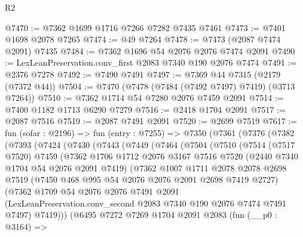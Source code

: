 \begin{lexlean}{R2}
\begin{coremodule}
@7470 := @7362 @1699 @1716 @7266 @7282 @7435 @7461
@7473 := @7401 @1698 @2078 @7265
@7474 := @49 @7264
@7478 := @7473 (@2087 @7474 @2091) @7435
@7484 := @7362 @1696 @54 @2076 @2076 @7474 @2091
@7490 := LexLeanPreservation.conv_first @2083 @7340 @190 @2076 @7474
@7491 := @2376 @7278
@7492 := @7490 @7491
@7497 := @7369 @44 @7315 (@2179 (@7372 @44))
@7504 := @7470 (@7478 (@7484 (@7492 @7497) @7419) (@3713 @7264))
@7510 := @7362 @1714 @54 @7280 @2076 @7459 @2091
@7514 := @7400 @1182 @1713 @6290 @7279
@7516 := @2418 @1704 @2091
@7517 := @2087 @7516
@7519 := @2087 @7491 @2091
@7520 := @2699 @7519
@7617 := fun (sofar : @2196) =>
  fun (entry : @7255) =>
  @7350
    (@7361
      (@7376
        (@7382
          (@7393
            (@7424
              (@7430
                (@7443
                  (@7449
                    (@7464
                      (@7504
                        (@7510
                          (@7514
                            (@7517 @7520)
                            @7459
                            (@7362
                              @1706
                              @1712
                              @2076
                              @3167
                              @7516
                              @7520
                              (@2440 @7340 @1704 @54 @2076 @2091 @7419)
                              (@7362
                                @1007
                                @1711
                                @2078
                                @2078
                                @2698
                                @7519
                                (@7450 @468 @995 @54 @2076 @2076 @2091 @2698 @7419 @2727)
                                (@7362
                                  @1709
                                  @54
                                  @2076
                                  @2076
                                  @7491
                                  @2091
                                  (LexLeanPreservation.conv_second
                                    @2083
                                    @7340
                                    @190
                                    @2076
                                    @7474
                                    @7491
                                    @7497)
                                  @7419)))
                            (@6495
                              @7272
                              @7269
                              @1704
                              @2091
                              @2083
                              (fun (__p0 : @3164) =>

\end{coremodule}
\end{lexlean}
